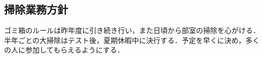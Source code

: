 \subsection*{掃除業務方針}
ゴミ箱のルールは昨年度に引き続き行い，また日頃から部室の掃除を心がける．半年ごとの大掃除はテスト後，夏期休暇中に決行する．予定を早くに決め，多くの人に参加してもらえるようにする．
